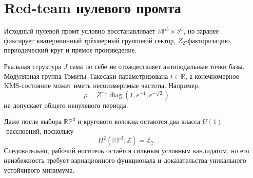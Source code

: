 \section*{Red-team нулевого промта}

Исходный нулевой промт условно восстанавливает
\(\mathbb{RP}^3\times S^1\), но заранее фиксирует кватернионный
трёхмерный групповой сектор, \(Z_2\)-факторизацию, периодический круг и
прямое произведение.

Реальная структура \(J\) сама по себе не отождествляет антиподальные точки
базы. Модулярная группа Томиты--Такесаки параметризована
\(t\in\mathbb R\), а конечномерное KMS-состояние может иметь несоизмеримые
частоты. Например,
\[
 \rho=Z^{-1}\operatorname{diag}(1,e^{-1},e^{-\sqrt2})
\]
не допускает общего ненулевого периода.

Даже после выбора \(\mathbb{RP}^3\) и кругового волокна остаются два класса
\(U(1)\)-расслоений, поскольку
\[
 H^2(\mathbb{RP}^3;\mathbb Z)=\mathbb Z_2.
\]
Следовательно, рабочий носитель остаётся сильным условным кандидатом, но его
неизбежность требует вариационного функционала и доказательства уникального
устойчивого минимума.